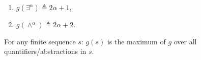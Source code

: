 \begin{enumerate}
\item $g(\exists^\alpha) \triangleq 2\alpha + 1$,
\item $g(\wedge^\alpha) \triangleq 2\alpha + 2$.
\end{enumerate}
For any finite sequence $s$: $g(s)$ is the maximum of $g$ over all quantifiers/abstractions in $s$.

